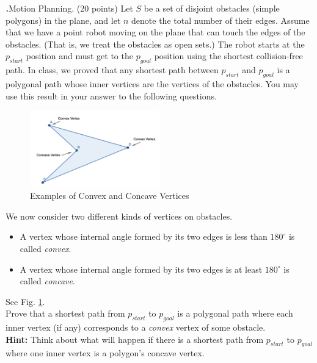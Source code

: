 \documentclass[12pt]{amsart}
\newenvironment{statement}[1]{\smallskip\noindent\color[rgb]{0.0,0.0,0.0} {\bf #1.}}{}
\theoremstyle{definition}
\theoremstyle{remark}
\newcommand{\1}{\mathds{1}}
\begin{document}
\newpage
\begin{statement}{4}
\emph{Motion Planning.} (20 points)
Let $S$ be a set of disjoint obstacles (simple polygons) in the plane, and let $n$ denote the total number of their
edges. Assume that we have a point robot moving on the plane that can touch the edges of the obstacles.
(That is, we treat the obstacles as open sets.) The robot starts at the $p_{start}$ position and must get to the
$p_{goal}$ position using the shortest collision-free path. In class, we proved that any shortest path between $p_{start}$
and $p_{goal}$ is a polygonal path whose inner vertices are the vertices of the obstacles. You may use this result
in your answer to the following questions.

\begin{figure}
    \centering
    \includegraphics[width=0.5\textwidth]{images/convex-concave.png}
    \caption{Examples of Convex and Concave Vertices}
    \label{fig:convex-concave}
\end{figure}

We now consider two different kinds of vertices on obstacles.
\begin{itemize}
    \item  A vertex whose internal angle formed by its two edges is less than $180^\circ$ is called \textit{convex}.
    \item A vertex whose internal angle formed by its two edges is at least $180^\circ$ is called \textit{concave}.
\end{itemize}
See Fig. \ref{fig:convex-concave}.\\

\noindent
Prove that a shortest path from $p_{start}$ to $p_{goal}$ is a polygonal path where each inner vertex (if any) corresponds to a \emph{convex} vertex of some obstacle.  \\
\noindent\textbf{Hint:} Think about what will happen if there is a shortest path from $p_{start}$ to $p_{goal}$ where one inner vertex is a polygon's concave vertex.
\end{statement}
\end{document}
